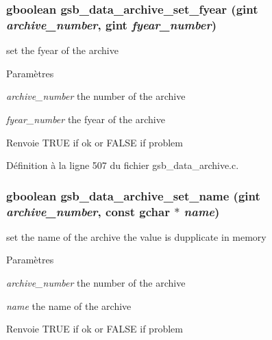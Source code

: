 \subsubsection[{gsb\_\-data\_\-archive\_\-set\_\-fyear}]{\setlength{\rightskip}{0pt plus 5cm}gboolean gsb\_\-data\_\-archive\_\-set\_\-fyear (gint {\em archive\_\-number}, \/  gint {\em fyear\_\-number})}\label{gsb__data__archive_8h_ae4edb9d1b45b34750d48ba8405db21bf}
set the fyear of the archive


\begin{DoxyParams}{Paramètres}
\item[{\em archive\_\-number}]the number of the archive \item[{\em fyear\_\-number}]the fyear of the archive\end{DoxyParams}
\begin{DoxyReturn}{Renvoie}
TRUE if ok or FALSE if problem 
\end{DoxyReturn}


Définition à la ligne 507 du fichier gsb\_\-data\_\-archive.c.

\subsubsection[{gsb\_\-data\_\-archive\_\-set\_\-name}]{\setlength{\rightskip}{0pt plus 5cm}gboolean gsb\_\-data\_\-archive\_\-set\_\-name (gint {\em archive\_\-number}, \/  const gchar $\ast$ {\em name})}\label{gsb__data__archive_8h_abfc44c529725db841973582c3cf438ed}
set the name of the archive the value is dupplicate in memory


\begin{DoxyParams}{Paramètres}
\item[{\em archive\_\-number}]the number of the archive \item[{\em name}]the name of the archive\end{DoxyParams}
\begin{DoxyReturn}{Renvoie}
TRUE if ok or FALSE if problem 
\end{DoxyReturn}


